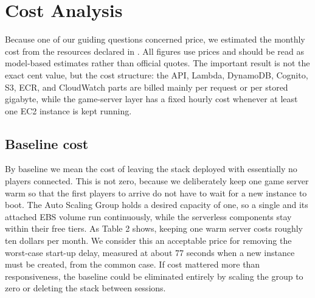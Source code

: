 
\section{Cost Analysis}

    Because one of our guiding questions concerned price, we estimated the monthly cost from the resources declared in . All figures use  prices and should be read as model-based estimates rather than official quotes. The important result is not the exact cent value, but the cost structure: the API, Lambda, DynamoDB, Cognito, S3, ECR, and CloudWatch parts are billed mainly per request or per stored gigabyte, while the game-server layer has a fixed hourly cost whenever at least one EC2 instance is kept running.

    \subsection{Baseline cost}

    By baseline we mean the cost of leaving the stack deployed with essentially no players connected. 
    This is not zero, because we deliberately keep one game server warm so that the first players to arrive do not have to wait for a new instance to boot.
    The Auto Scaling Group holds a desired capacity of one, so a single  and its attached EBS volume run continuously, while the serverless components stay within their free tiers. 
    As Table 2 shows, keeping one warm server costs roughly ten dollars per month. We consider this an acceptable price for removing the worst-case start-up delay, measured at about 77 seconds when a new instance must be created, from the common case. 
    If cost mattered more than responsiveness, the baseline could be eliminated entirely by scaling the group to zero or deleting the stack between sessions.

